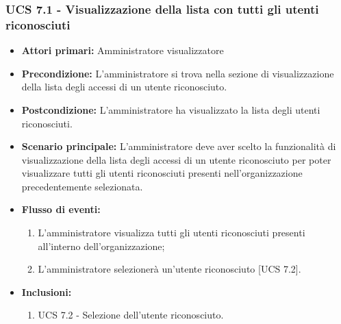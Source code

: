 \subsubsection{UCS 7.1 - Visualizzazione della lista con tutti gli utenti riconosciuti }
\begin{itemize}
	\item \textbf{Attori primari:} Amministratore visualizzatore
	\item \textbf{Precondizione:} L'amministratore si trova nella sezione di visualizzazione della lista degli accessi di un utente riconosciuto.
	\item \textbf{Postcondizione:} L'amministratore ha visualizzato la lista degli utenti riconosciuti.
	\item \textbf{Scenario principale:} L'amministratore deve aver scelto la funzionalità di visualizzazione della lista degli accessi di un utente riconosciuto per poter visualizzare tutti gli utenti riconosciuti presenti nell'organizzazione precedentemente selezionata.
	\item \textbf{Flusso di eventi:} 
	\begin{enumerate}
		\item L'amministratore visualizza tutti gli utenti riconosciuti presenti all'interno dell'organizzazione;
		\item L'amministratore selezionerà un'utente riconosciuto [UCS 7.2].
	\end{enumerate}
	\item \textbf{Inclusioni:}
	\begin{enumerate}
		\item UCS 7.2 - Selezione dell'utente riconosciuto.
	\end{enumerate}
\end{itemize}

